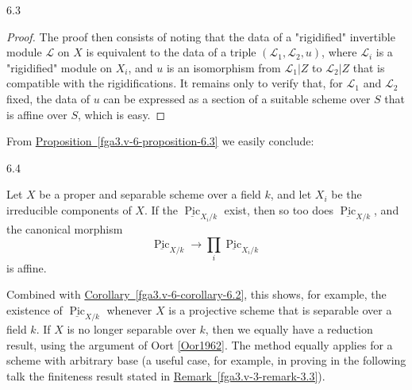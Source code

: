 \begin{proposition}{6.3}
\begin{proof}
      The proof then consists of noting that the data of a "rigidified" invertible module \(\mathscr {L}\) on \(X\) is equivalent to the data of a triple \((\mathscr {L}_1,\mathscr {L}_2,u)\), where \(\mathscr {L}_i\) is a "rigidified" module on \(X_i\), and \(u\) is an isomorphism from \(\mathscr {L}_1|Z\) to \(\mathscr {L}_2|Z\) that is compatible with the rigidifications.
      It remains only to verify that, for \(\mathscr {L}_1\) and \(\mathscr {L}_2\) fixed, the data of \(u\) can be expressed as a section of a suitable scheme over \(S\) that is affine over \(S\), which is easy.\end{proof}\end{proposition}\par{}From \hyperref[fga3.v-6-proposition-6.3]{Proposition~\ref*{fga3.v-6-proposition-6.3}} we easily conclude:\begin{corollary}{6.4}\label{fga3.v-6-corollary-6.4}\skipsinglepar\par{}Let \(X\) be a proper and separable scheme over a field \(k\), and let \(X_i\) be the irreducible components of \(X\).
    If the \(\underline {\operatorname {Pic}}_{X_i/k}\) exist, then so too does \(\underline {\operatorname {Pic}}_{X/k}\), and the canonical morphism
    \[       \underline {\operatorname {Pic}}_{X/k}       \to  \prod _i \underline {\operatorname {Pic}}_{X_i/k}     \]
    is affine.\end{corollary}\par{}Combined with \hyperref[fga3.v-6-corollary-6.2]{Corollary~\ref*{fga3.v-6-corollary-6.2}}, this shows, for example, the existence of \(\underline {\operatorname {Pic}}_{X/k}\) whenever \(X\) is a projective scheme that is separable over a field \(k\).
  If \(X\) is no longer separable over \(k\), then we equally have a reduction result, using the argument of Oort \hyperref[Oor1962]{[Oor1962]}.
  The method equally applies for a scheme with arbitrary base (a useful case, for example, in proving in the following talk the finiteness result stated in \hyperref[fga3.v-3-remark-3.3]{Remark~\ref*{fga3.v-3-remark-3.3}}).
